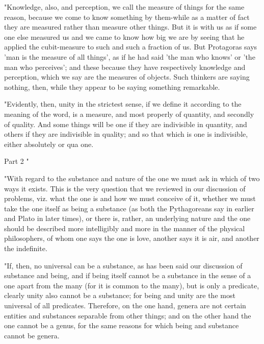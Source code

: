 "Knowledge, also, and perception, we call the measure of things for
the same reason, because we come to know something by them-while as
a matter of fact they are measured rather than measure other things.
But it is with us as if some one else measured us and we came to know
how big we are by seeing that he applied the cubit-measure to such
and such a fraction of us. But Protagoras says 'man is the measure
of all things', as if he had said 'the man who knows' or 'the man
who perceives'; and these because they have respectively knowledge
and perception, which we say are the measures of objects. Such thinkers
are saying nothing, then, while they appear to be saying something
remarkable. 

"Evidently, then, unity in the strictest sense, if we define it according
to the meaning of the word, is a measure, and most properly of quantity,
and secondly of quality. And some things will be one if they are indivisible
in quantity, and others if they are indivisible in quality; and so
that which is one is indivisible, either absolutely or qua one.

Part 2 "

"With regard to the substance and nature of the one we must ask in
which of two ways it exists. This is the very question that we reviewed
in our discussion of problems, viz. what the one is and how we must
conceive of it, whether we must take the one itself as being a substance
(as both the Pythagoreans say in earlier and Plato in later times),
or there is, rather, an underlying nature and the one should be described
more intelligibly and more in the manner of the physical philosophers,
of whom one says the one is love, another says it is air, and another
the indefinite. 

"If, then, no universal can be a substance, as has been said our discussion
of substance and being, and if being itself cannot be a substance
in the sense of a one apart from the many (for it is common to the
many), but is only a predicate, clearly unity also cannot be a substance;
for being and unity are the most universal of all predicates. Therefore,
on the one hand, genera are not certain entities and substances separable
from other things; and on the other hand the one cannot be a genus,
for the same reasons for which being and substance cannot be genera.

